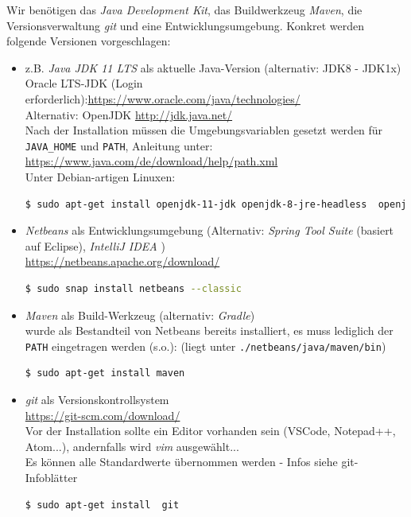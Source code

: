 \documentclass[10pt]{scrartcl}
\begin{document}
Wir benötigen das \textit{Java Development Kit}, das Buildwerkzeug \textit{Maven}, die Versionsverwaltung \textit{git} und eine Entwicklungsumgebung. Konkret werden folgende Versionen vorgeschlagen:
\begin{itemize}
	\item z.B. \textit{Java JDK 11 LTS} als aktuelle Java-Version (alternativ: JDK8 - JDK1x)
	\\
	Oracle LTS-JDK (Login erforderlich):\url{https://www.oracle.com/java/technologies/}\\
	Alternativ: OpenJDK \url{http://jdk.java.net/}\\
	Nach der Installation müssen die Umgebungsvariablen gesetzt werden für \texttt{JAVA\_HOME} und \texttt{PATH}, Anleitung unter: \url{https://www.java.com/de/download/help/path.xml}\\
	Unter Debian-artigen Linuxen:
	\begin{lstlisting}[language=bash,belowskip=2mm,frame=t]
	$ sudo apt-get install openjdk-11-jdk openjdk-8-jre-headless  openjfx
	\end{lstlisting}
	\item 
	\textit{Netbeans} als Entwicklungsumgebung (Alternativ: \textit{Spring Tool Suite} (basiert auf Eclipse), \textit{IntelliJ IDEA} )\\
	\url{https://netbeans.apache.org/download/}\\
	\begin{lstlisting}[language=bash,belowskip=2mm,frame=t]
	$ sudo snap install netbeans --classic
	\end{lstlisting}

	\item 
	\textit{Maven}  als Build-Werkzeug (alternativ: \textit{Gradle})\\
	wurde als Bestandteil von Netbeans bereits installiert, es muss lediglich der \texttt{PATH} eingetragen werden (s.o.):
	(liegt unter \texttt{./netbeans/java/maven/bin})
	\begin{lstlisting}[language=bash,belowskip=2mm,frame=t]
	$ sudo apt-get install maven
	\end{lstlisting}
	
	\item \textit{git} als Versionskontrollsystem\\  \url{https://git-scm.com/download/} \\
	Vor der Installation sollte ein Editor vorhanden sein (VSCode, Notepad++, Atom...), andernfalls wird \textit{vim} ausgewählt...\\
	Es können alle Standardwerte übernommen werden - Infos siehe \textsf{git}-Infoblätter
	\\
	\begin{lstlisting}[language=bash,belowskip=2mm,frame=t]
	$ sudo apt-get install  git
	\end{lstlisting}

\end{itemize}
\end{document}
